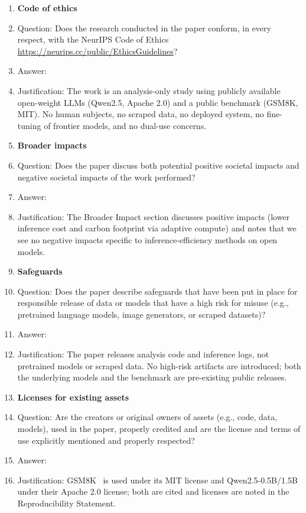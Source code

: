 \documentclass{article}
\begin{document}
\begin{enumerate}
\item {\bf Code of ethics}
    \item[] Question: Does the research conducted in the paper conform, in every respect, with the NeurIPS Code of Ethics \url{https://neurips.cc/public/EthicsGuidelines}?
    \item[] Answer: \answerYes{}
    \item[] Justification: The work is an analysis-only study using publicly available open-weight LLMs (Qwen2.5, Apache 2.0) and a public benchmark (GSM8K, MIT). No human subjects, no scraped data, no deployed system, no fine-tuning of frontier models, and no dual-use concerns.

\item {\bf Broader impacts}
    \item[] Question: Does the paper discuss both potential positive societal impacts and negative societal impacts of the work performed?
    \item[] Answer: \answerYes{}
    \item[] Justification: The Broader Impact section discusses positive impacts (lower inference cost and carbon footprint via adaptive compute) and notes that we see no negative impacts specific to inference-efficiency methods on open models.

\item {\bf Safeguards}
    \item[] Question: Does the paper describe safeguards that have been put in place for responsible release of data or models that have a high risk for misuse (e.g., pretrained language models, image generators, or scraped datasets)?
    \item[] Answer: \answerNA{}
    \item[] Justification: The paper releases analysis code and inference logs, not pretrained models or scraped data. No high-risk artifacts are introduced; both the underlying models and the benchmark are pre-existing public releases.

\item {\bf Licenses for existing assets}
    \item[] Question: Are the creators or original owners of assets (e.g., code, data, models), used in the paper, properly credited and are the license and terms of use explicitly mentioned and properly respected?
    \item[] Answer: \answerYes{}
    \item[] Justification: GSM8K~\citep{cobbe2021gsm8k} is used under its MIT license and Qwen2.5-0.5B/1.5B under their Apache 2.0 license; both are cited and licenses are noted in the Reproducibility Statement.


\end{enumerate}
\end{document}
